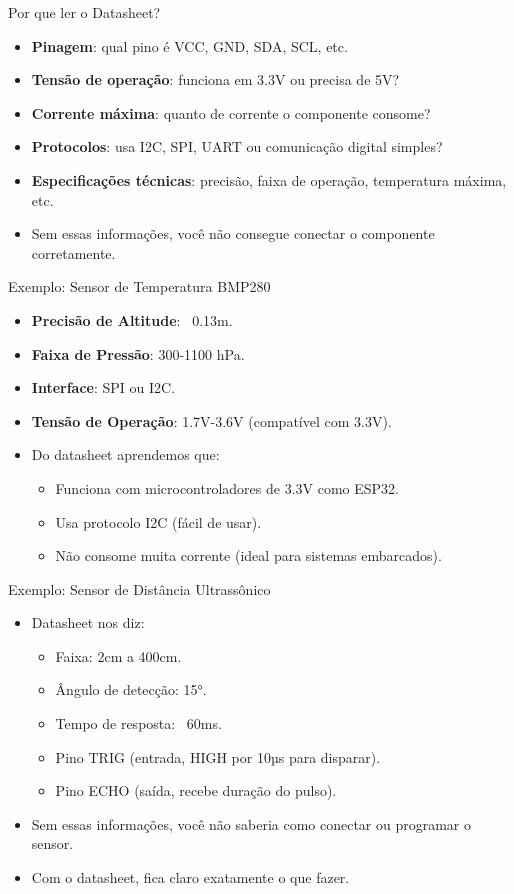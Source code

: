 \documentclass[10pt]{beamer}
\begin{document}
\begin{frame}{Por que ler o Datasheet?}
  \begin{itemize}
    \item \textbf{Pinagem}: qual pino é VCC, GND, SDA, SCL, etc.
    \item \textbf{Tensão de operação}: funciona em 3.3V ou precisa de 5V?
    \item \textbf{Corrente máxima}: quanto de corrente o componente consome?
    \item \textbf{Protocolos}: usa I2C, SPI, UART ou comunicação digital simples?
    \item \textbf{Especificações técnicas}: precisão, faixa de operação, temperatura máxima, etc.
    \item Sem essas informações, você não consegue conectar o componente corretamente.
  \end{itemize}
\end{frame}

\begin{frame}{Exemplo: Sensor de Temperatura BMP280}
  \begin{itemize}
    \item \textbf{Precisão de Altitude}: ~0.13m.
    \item \textbf{Faixa de Pressão}: 300-1100 hPa.
    \item \textbf{Interface}: SPI ou I2C.
    \item \textbf{Tensão de Operação}: 1.7V-3.6V (compatível com 3.3V).
    \item Do datasheet aprendemos que:
    \begin{itemize}
      \item Funciona com microcontroladores de 3.3V como ESP32.
      \item Usa protocolo I2C (fácil de usar).
      \item Não consome muita corrente (ideal para sistemas embarcados).
    \end{itemize}
  \end{itemize}
\end{frame}

\begin{frame}{Exemplo: Sensor de Distância Ultrassônico}
  \begin{itemize}
    \item Datasheet nos diz:
    \begin{itemize}
      \item Faixa: 2cm a 400cm.
      \item Ângulo de detecção: 15°.
      \item Tempo de resposta: ~60ms.
      \item Pino TRIG (entrada, HIGH por 10µs para disparar).
      \item Pino ECHO (saída, recebe duração do pulso).
    \end{itemize}
    \item Sem essas informações, você não saberia como conectar ou programar o sensor.
    \item Com o datasheet, fica claro exatamente o que fazer.
  \end{itemize}
\end{frame}
\end{document}
